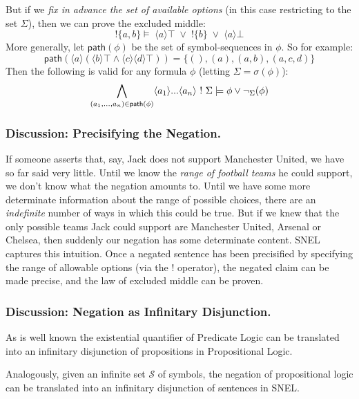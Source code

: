 But if we \emph{fix in advance the set of available options} (in this case restricting to the set $\Sigma$), then we can prove the excluded middle:
\[
!\{a, b\} \models \; \langle a \rangle \top \; \lor \; ! \{b\} \; \lor \; \langle a \rangle \bot
\]
More generally, let $\mathsf{path}(\phi)$ be the set of symbol-sequences in $\phi$.
So for example:
\[
\mathsf{path}(\langle a \rangle (\langle b \rangle \top \land \langle c \rangle \langle d \rangle \top)) = \{(), (a), (a, b), (a, c, d)\}
\]
Then the following is valid for any formula $\phi$ (letting $\Sigma = \sigma(\phi)$): 
\[
\bigwedge_{(a_1, ..., a_n) \in \mathsf{path}(\phi)} \langle a_1 \rangle ... \langle a_n \rangle \ ! \  \Sigma \models \phi \lor \neg_\Sigma (\phi)
\]
\subsubsection{Discussion: Precisifying the Negation. }
If someone asserts that, say, Jack does not support Manchester United, we have so far said very little. 
Until we know the \emph{range of football teams} he could support, we don't know what the negation amounts to. 
Until we have some more determinate information about the range of possible choices, there are an \emph{indefinite} number of ways in which this could be true.
But if we knew that the only possible teams Jack could support are Manchester United, Arsenal or Chelsea, then suddenly our negation has some determinate content.
SNEL captures this intuition. 
Once a negated sentence has been precisified by specifying the range of allowable options (via the $!$ operator), the negated claim can be made precise, and the law of excluded middle can be proven.

\subsubsection{Discussion: Negation as Infinitary Disjunction. }
As is well known the existential quantifier of Predicate Logic can be translated into an infinitary disjunction of propositions in Propositional Logic.

Analogously, given an infinite set $\mathcal{S}$ of symbols, the negation of propositional logic can be translated into an infinitary disjunction of sentences in SNEL.



